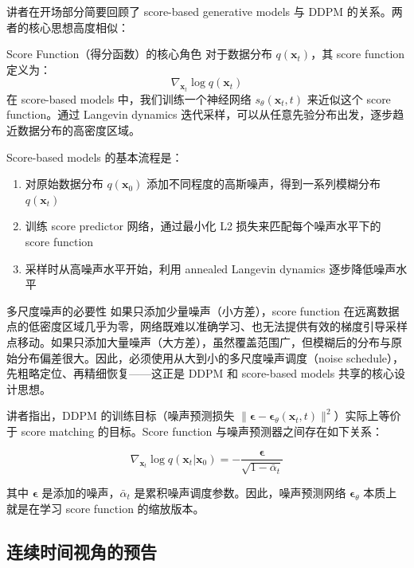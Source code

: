 讲者在开场部分简要回顾了 score-based generative models 与 DDPM 的关系。两者的核心思想高度相似：

\begin{knowledgebox}{Score Function（得分函数）的核心角色}
对于数据分布 $q(\mathbf{x}_t)$，其 score function 定义为：
$$
\nabla_{\mathbf{x}_t} \log q(\mathbf{x}_t)
$$
在 score-based models 中，我们训练一个神经网络 $s_\theta(\mathbf{x}_t, t)$ 来近似这个 score function。通过 Langevin dynamics 迭代采样，可以从任意先验分布出发，逐步趋近数据分布的高密度区域。
\end{knowledgebox}

Score-based models 的基本流程是：
\begin{enumerate}
    \item 对原始数据分布 $q(\mathbf{x}_0)$ 添加不同程度的高斯噪声，得到一系列模糊分布 $q(\mathbf{x}_t)$
    \item 训练 score predictor 网络，通过最小化 L2 损失来匹配每个噪声水平下的 score function
    \item 采样时从高噪声水平开始，利用 annealed Langevin dynamics 逐步降低噪声水平
\end{enumerate}

\begin{warningbox}{多尺度噪声的必要性}
如果只添加少量噪声（小方差），score function 在远离数据点的低密度区域几乎为零，网络既难以准确学习、也无法提供有效的梯度引导采样点移动。如果只添加大量噪声（大方差），虽然覆盖范围广，但模糊后的分布与原始分布偏差很大。因此，必须使用从大到小的多尺度噪声调度（noise schedule），先粗略定位、再精细恢复——这正是 DDPM 和 score-based models 共享的核心设计思想。
\end{warningbox}

讲者指出，DDPM 的训练目标（噪声预测损失 $\|\boldsymbol{\epsilon} - \boldsymbol{\epsilon}_\theta(\mathbf{x}_t, t)\|^2$）实际上等价于 score matching 的目标。Score function 与噪声预测器之间存在如下关系：

$$
\nabla_{\mathbf{x}_t} \log q(\mathbf{x}_t | \mathbf{x}_0) = -\frac{\boldsymbol{\epsilon}}{\sqrt{1 - \bar{\alpha}_t}}
$$

其中 $\boldsymbol{\epsilon}$ 是添加的噪声，$\bar{\alpha}_t$ 是累积噪声调度参数。因此，噪声预测网络 $\boldsymbol{\epsilon}_\theta$ 本质上就是在学习 score function 的缩放版本。

\subsection{连续时间视角的预告}

